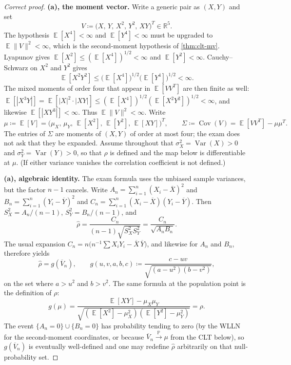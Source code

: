 \documentclass[11pt,a4paper]{article}
\DeclareMathOperator{\Var}{Var}
\DeclareMathOperator{\E}{\mathbb{E}}
\DeclareMathOperator{\Pbb}{\mathbb{P}}
\begin{document}
\begin{proof}[Correct proof]
\textbf{(a), the moment vector.}
Write a generic pair as \( (X,Y) \) and set
\[
V
\coloneqq
\bigl(X,\,Y,\,X^{2},\,Y^{2},\,XY\bigr)^{T}
\in
\mathbb{R}^{5}.
\]
The hypothesis \( \E[X^{4}]<\infty \) and \( \E[Y^{4}]<\infty \) must be upgraded to \( \E\|V\|^{2}<\infty \), which is the second-moment hypothesis of \cref{thm:clt-mv}. Lyapunov gives \( \E[X^{2}]\le(\E[X^{4}])^{1/2}<\infty \) and \( \E[Y^{2}]<\infty \). Cauchy--Schwarz on \( X^{2} \) and \( Y^{2} \) gives
\[
\E[X^{2}Y^{2}]
\le
\bigl(\E[X^{4}]\bigr)^{1/2}\bigl(\E[Y^{4}]\bigr)^{1/2}
<
\infty.
\]
The mixed moments of order four that appear in \( \E[VV^{T}] \) are then finite as well: \( \E[|X^{3}Y|]=\E[|X|^{2}\cdot|XY|]\le(\E[X^{4}])^{1/2}(\E[X^{2}Y^{2}])^{1/2}<\infty \), and likewise \( \E[|XY^{3}|]<\infty \). Thus \( \E\|V\|^{2}<\infty \). Write
\[
\mu
\coloneqq
\E[V]
=
\bigl(\mu_X,\,\mu_Y,\,\E[X^{2}],\,\E[Y^{2}],\,\E[XY]\bigr)^{T},
\qquad
\Sigma
\coloneqq
\operatorname{Cov}(V)
=
\E[VV^{T}]-\mu\mu^{T}.
\]
The entries of \( \Sigma \) are moments of \( (X,Y) \) of order at most four; the exam does not ask that they be expanded. Assume throughout that \( \sigma_X^{2}=\Var(X)>0 \) and \( \sigma_Y^{2}=\Var(Y)>0 \), so that \( \rho \) is defined and the map below is differentiable at \( \mu \). (If either variance vanishes the correlation coefficient is not defined.)

\textbf{(a), algebraic identity.}
The exam formula uses the unbiased sample variances, but the factor \( n-1 \) cancels. Write \( A_n=\sum_{i=1}^{n}(X_i-\overline{X})^{2} \) and \( B_n=\sum_{i=1}^{n}(Y_i-\overline{Y})^{2} \) and \( C_n=\sum_{i=1}^{n}(X_i-\overline{X})(Y_i-\overline{Y}) \). Then \( S_X^{2}=A_n/(n-1) \), \( S_Y^{2}=B_n/(n-1) \), and
\[
\hat{\rho}
=
\frac{C_n}{(n-1)\sqrt{S_X^{2}S_Y^{2}}}
=
\frac{C_n}{\sqrt{A_n B_n}}.
\]
The usual expansion \( C_n=n\bigl(n^{-1}\sum X_i Y_i-\overline{X}\,\overline{Y}\bigr) \), and likewise for \( A_n \) and \( B_n \), therefore yields
\[
\hat{\rho}
=
g(\overline{V}_n),
\qquad
g(u,v,a,b,c)
\coloneqq
\frac{c-uv}{\sqrt{(a-u^{2})(b-v^{2})}},
\]
on the set where \( a>u^{2} \) and \( b>v^{2} \). The same formula at the population point is the definition of \( \rho \):
\[
g(\mu)
=
\frac{\E[XY]-\mu_X\mu_Y}{\sqrt{(\E[X^{2}]-\mu_X^{2})(\E[Y^{2}]-\mu_Y^{2})}}
=
\rho.
\]
The event \( \{A_n=0\}\cup\{B_n=0\} \) has probability tending to zero (by the WLLN for the second-moment coordinates, or because \( \overline{V}_n\xrightarrow{\Pbb}\mu \) from the CLT below), so \( g(\overline{V}_n) \) is eventually well-defined and one may redefine \( \hat{\rho} \) arbitrarily on that null-probability set.


\end{proof}
\end{document}
